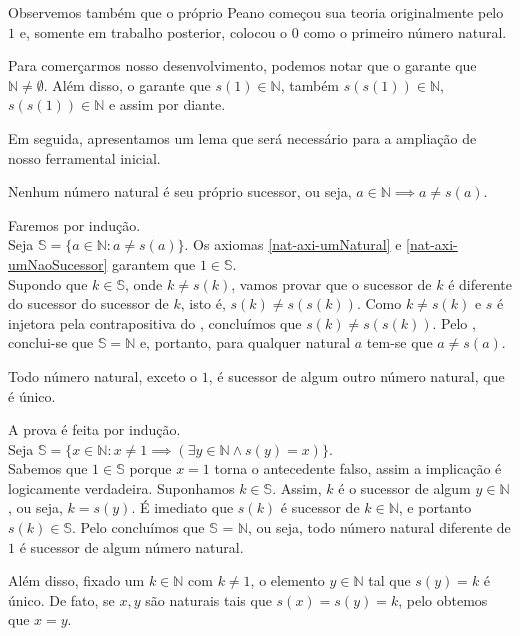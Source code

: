\documentclass[../main.tex]{subfiles}
\begin{document}

Observemos também que o próprio Peano começou sua teoria originalmente pelo $1$ e, somente em trabalho posterior, colocou o $0$ como o primeiro número natural.

Para comerçarmos nosso desenvolvimento, podemos notar que o  garante que $\mathbb{N} \neq \emptyset $. Além disso, o  garante que $s(1) \in \mathbb{N}$, também $s(s(1)) \in \mathbb{N}$, $s(s(1)) \in \mathbb{N}$ e assim por diante.

Em seguida, apresentamos um lema que será necessário para a ampliação de nosso ferramental inicial.
\begin{lema}\label{nat-lema-nenhumNumeroProprioSucessor}
    Nenhum número natural é seu próprio sucessor, ou seja, $a \in \mathbb{N} \implies a \neq s(a) $.
\end{lema}
\begin{dem}
    Faremos por indução.\\
    Seja $\mathbb{S} = \{a \in \mathbb{N} : a \neq s(a) \}$.
    Os axiomas \ref{nat-axi-umNatural} e \ref{nat-axi-umNaoSucessor} garantem que $1 \in \mathbb{S}$.\\
    Supondo que $ k \in \mathbb{S}$, onde $ k \neq s(k)$, vamos provar que o sucessor de $k$ é diferente do sucessor do sucessor de $k$, isto é, $s(k) \neq s(s(k))$. Como $k \neq s(k)$ e $s$ é injetora pela contrapositiva do , concluímos que $s(k) \neq s(s(k))$. Pelo , conclui-se que $\mathbb{S} = \mathbb{N}$ e, portanto, para qualquer natural $a$ tem-se que $a \neq s(a)$.
\end{dem}
\begin{teo}\label{nat-teo-todoNaturalESucessor}
    Todo número natural, exceto o $1$, é sucessor de algum outro número natural, que é único.
\end{teo}
\begin{dem}
    A prova é feita por indução.  \\ 
    Seja $\mathbb{S} = \{x \in \mathbb{N} : x \neq 1 \implies (\exists y \in \mathbb{N} \land s(y) = x) \}$.\\
    Sabemos que $1 \in \mathbb{S}$ porque $x = 1$ torna o antecedente falso, assim a implicação é logicamente verdadeira. Suponhamos $k \in \mathbb{S}$. Assim, $k$ é o sucessor de algum $y \in \mathbb{N}$, ou seja, $k = s(y)$. É imediato que $s(k)$ é sucessor de $k \in \mathbb{N}$, e portanto $s(k) \in \mathbb{S}$. Pelo  concluímos que $\mathbb{S}$ = $\mathbb{N}$, ou seja, todo número natural diferente de $1$ é sucessor de algum número natural.

    Além disso, fixado um $k \in \mathbb{N}$ com $k \neq 1$, o elemento $y \in \mathbb{N}$ tal que $s(y) = k$ é único. De fato, se $x,y$ são naturais tais que $s(x) = s(y) = k$, pelo  obtemos que $x = y$.
\end{dem}
\end{document}
